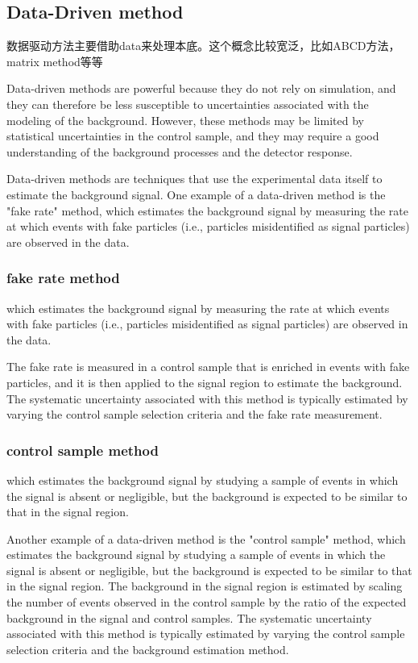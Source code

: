 \documentclass{ctexart}
\begin{document}
\subsection{Data-Driven method}
数据驱动方法主要借助data来处理本底。这个概念比较宽泛，比如ABCD方法，matrix method等等\newline

Data-driven methods are powerful because they do not rely on simulation, and they can therefore be less susceptible to uncertainties associated with the modeling of the background. However, these methods may be limited by statistical uncertainties in the control sample, and they may require a good understanding of the background processes and the detector response.\newline

Data-driven methods are techniques that use the experimental data itself to estimate the background signal. One example of a data-driven method is the "fake rate" method, which estimates the background signal by measuring the rate at which events with fake particles (i.e., particles misidentified as signal particles) are observed in the data.\newline


\subsubsection{fake rate method}
which estimates the background signal by measuring the rate at which events with fake particles (i.e., particles misidentified as signal particles) are observed in the data.\newline

The fake rate is measured in a control sample that is enriched in events with fake particles, and it is then applied to the signal region to estimate the background. The systematic uncertainty associated with this method is typically estimated by varying the control sample selection criteria and the fake rate measurement.
\subsubsection{control sample method}
which estimates the background signal by studying a sample of events in which the signal is absent or negligible, but the background is expected to be similar to that in the signal region.\newline

Another example of a data-driven method is the "control sample" method, which estimates the background signal by studying a sample of events in which the signal is absent or negligible, but the background is expected to be similar to that in the signal region. The background in the signal region is estimated by scaling the number of events observed in the control sample by the ratio of the expected background in the signal and control samples. The systematic uncertainty associated with this method is typically estimated by varying the control sample selection criteria and the background estimation method.
\end{document}
